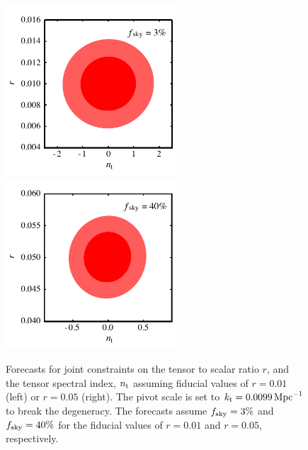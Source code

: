 \begin{figure}[th]
\begin{center}
\includegraphics[width=2.5in]{Inflation/rnt_r01}
\includegraphics[width=2.5in]{Inflation/rnt_r05}
\end{center}
\caption{ Forecasts for joint constraints on the tensor to scalar ratio $r$, and the tensor spectral index, $n_{\rm t}$ assuming fiducial values of $r=0.01$ (left) or $r=0.05$ (right). The pivot scale is set to $k_{\rm t}=0.0099\, \rm{Mpc}^{-1}$ to break the degeneracy. The forecasts assume $f_{\rm sky}=3\%$ and $f_{\rm sky}=40\%$ for the fiducial values of $r=0.01$ and $r=0.05$, respectively.}
\label{fig:rnT}
\end{figure}


